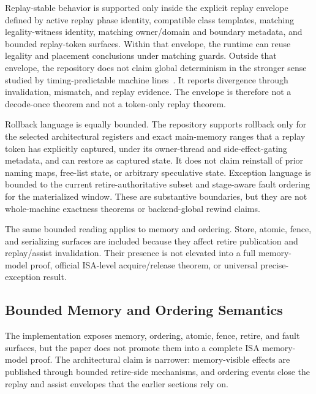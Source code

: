 \documentclass[twocolumn]{article}
\begin{document}
Replay-stable behavior is supported only inside the explicit replay envelope defined by active replay phase identity, compatible class templates, matching legality-witness identity, matching owner/domain and boundary metadata, and bounded replay-token surfaces. Within that envelope, the runtime can reuse legality and placement conclusions under matching guards. Outside that envelope, the repository does not claim global determinism in the stronger sense studied by timing-predictable machine lines~\cite{edwards2007pret,zimmer2014flexpret,reineke2011pret}. It reports divergence through invalidation, mismatch, and replay evidence. The envelope is therefore not a decode-once theorem and not a token-only replay theorem.

Rollback language is equally bounded. The repository supports rollback only for the selected architectural registers and exact main-memory ranges that a replay token has explicitly captured, under its owner-thread and side-effect-gating metadata, and can restore as captured state. It does not claim reinstall of prior naming maps, free-list state, or arbitrary speculative state. Exception language is bounded to the current retire-authoritative subset and stage-aware fault ordering for the materialized window. These are substantive boundaries, but they are not whole-machine exactness theorems or backend-global rewind claims.

The same bounded reading applies to memory and ordering. Store, atomic, fence, and serializing surfaces are included because they affect retire publication and replay/assist invalidation. Their presence is not elevated into a full memory-model proof, official ISA-level acquire/release theorem, or universal precise-exception result.


\subsection{Bounded Memory and Ordering Semantics}

The implementation exposes memory, ordering, atomic, fence, retire, and fault surfaces, but the paper does not promote them into a complete ISA memory-model proof. The architectural claim is narrower: memory-visible effects are published through bounded retire-side mechanisms, and ordering events close the replay and assist envelopes that the earlier sections rely on.


\end{document}
